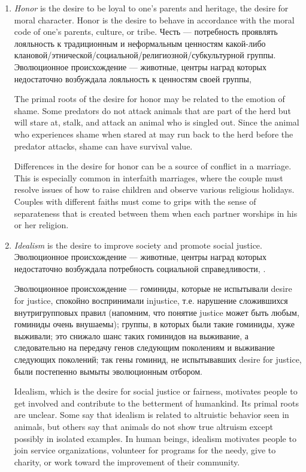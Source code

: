 \documentclass[11pt]{article}
\theoremstyle{remark}
\theoremstyle{definition}
\begin{document}
\begin{enumerate}
\item \textit{Honor} is the desire to be loyal to one’s parents and heritage, the desire for moral character. Honor is the desire to behave in accordance with the moral code of one’s parents, culture, or tribe. Честь --- потребность проявлять лояльность к традиционным и неформальным ценностям какой-либо клановой/этнической/социальной/религиозной/субкультурной группы. Эволюционное происхождение --- животные, центры наград которых недостаточно возбуждала лояльность к ценностям своей группы, 

The primal roots of the desire for honor may be related to the emotion of shame. Some predators do not attack animals that are part of the herd but will stare at, stalk, and attack an animal who is singled out. Since the animal who experiences shame when stared at may run back to the herd before the predator attacks, shame can have survival value.

Differences in the desire for honor can be a source of conflict in a marriage. This is especially common in interfaith marriages, where the couple must resolve issues of how to raise children and observe various religious holidays. Couples with different faiths must come to grips with the sense of separateness that is created between them when each partner worships in his or her religion.



\item \textit{Idealism} is the desire to improve society and promote social justice. Эволюционное происхождение --- животные, центры наград которых недостаточно возбуждала потребность социальной справедливости, .

Эволюционное происхождение --- гоминиды, которые не испытывали desire for justice, спокойно воспринимали injustice, т.е. нарушение сложившихся внутригрупповых правил (напомним, что понятие justice может быть любым, гоминиды очень внушаемы); группы, в которых были такие гоминиды, хуже выживали; это снижало шанс таких гоминидов на выживание, а следовательно на передачу генов следующим поколениям и выживание следующих поколений; так гены гоминид, не испытывавших desire for justice, были постепенно вымыты эволюционным отбором.





Idealism, which is the desire for social justice or fairness, motivates people to get involved and contribute to the betterment of humankind. Its primal roots are unclear. Some say that idealism is related to altruistic behavior seen in animals, but others say that animals do not show true altruism except possibly in isolated examples. In human beings, idealism motivates people to join service organizations, volunteer for programs for the needy, give to charity, or work toward the improvement of their community. 


\end{enumerate}
\end{document}

